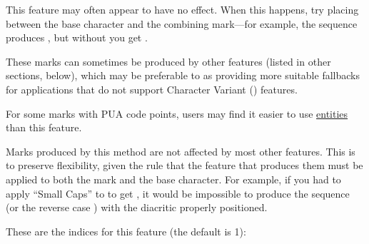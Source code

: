 This feature may often appear to have no effect. When this happens, try placing
\hyperlink{cgj}{}  between the base character
and the combining mark—for example, the sequence  produces
, but without  you get .

These marks can sometimes be produced by other  features 
(listed in other sections, below), which may be preferable to
 as providing more suitable fallbacks for 
applications that do not support Character Variant
() features.

For some marks with PUA code points, users may find it easier to use 
\hyperlink{ss10}{entities} than this feature.

Marks produced by this method are not affected by most other features.
This is to preserve flexibility, given the rule that the feature
that produces them must be applied to both the mark and the base character. For example, if you had to
apply  “Small Caps” to  to get
, it would be impossible to produce the sequence
(or the reverse case )
with the diacritic properly positioned.

These are the indices for this feature (the default is 1):

